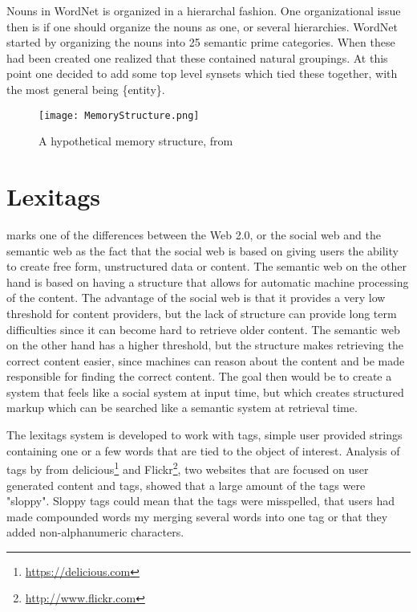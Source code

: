 Nouns in WordNet is organized in a hierarchal fashion. 
One organizational issue then is if one should organize the nouns as one, or several hierarchies.
WordNet started by organizing the nouns into 25 semantic prime categories.
When these had been created one realized that these contained natural groupings.
At this point one decided to add some top level synsets which tied these together, 
with the most general being \{entity\}\citep{Miller1990a}.

\begin{figure}[h]
    \begin{center}
        \texttt{[image: MemoryStructure.png]}
        \caption{A hypothetical memory structure, from \protect \citet{Collins1969}}
        \label{MemoryStructure}
    \end{center}
\end{figure}


\section{Lexitags}
\label{Lexitags}
\citet{Veres2011} marks one of the differences between the Web 2.0, or the social web and the semantic web as the
fact that the social web is based on giving users the ability to create free form, unstructured data or content.
The semantic web on the other hand is based on having a structure that allows for automatic machine processing of the content.
The advantage of the social web is that it provides a very low threshold for content providers, 
but the lack of structure can provide long term difficulties since it can become hard to retrieve older content.
The semantic web on the other hand has a higher threshold, 
but the structure makes retrieving the correct content easier,
since machines can reason about the content and be made responsible for finding the correct content.
The goal then would be to create a system that feels like a social system at input time, 
but which creates structured markup which can be searched like a semantic system at retrieval time.

The lexitags system is developed to work with tags, 
simple user provided strings containing one or a few words that are tied to the object of interest. 
Analysis of tags by \citet{Tonkin2006} from delicious\footnote{\url{https://delicious.com}} and Flickr\footnote{\url{http://www.flickr.com}},
two websites that are focused on user generated content and tags,
showed that a large amount of the tags were "sloppy". 
Sloppy tags could mean that the tags were misspelled,
that users had made compounded words my merging several words into one tag
or that they added non-alphanumeric characters.

